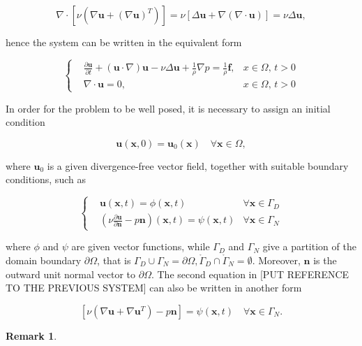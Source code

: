\documentclass[11pt,a4paper,titlepage]{report}
\newtheorem*{remark}{Remark}
\begin{document}
\[
\nabla \cdot [ \nu (\nabla \mathbf{u} + (\nabla  \mathbf{u})^T)] = \nu [\Delta \mathbf{u} + \nabla(\nabla \cdot \mathbf{u})] = \nu \Delta \mathbf{u},
\]

hence the system can be written in the equivalent form

\[
\left\{  
\begin{aligned}
&\frac{\partial \mathbf{u}}{\partial t} + ( \mathbf{u} \cdot \nabla) \mathbf{u} - \nu \Delta \mathbf{u} + \frac{1}{\rho} \nabla p = \frac{1}{\rho} \mathbf{f},  & x \in \Omega, \, t>0 \\
& \nabla \cdot \mathbf{u} = 0, & x \in \Omega, \, t>0
\end{aligned}
\right.
\]

In order for the problem to be well posed, it is necessary to assign an initial condition 

\[
\mathbf{u} (\mathbf{x}, 0) = \mathbf{u}_0(\mathbf{x}) \quad \forall \mathbf{x} \in \Omega,
\]

where $\mathbf{u}_0$ is a given divergence-free vector field, together with suitable boundary conditions, such as

\[
\left\{  
\begin{aligned}
& \mathbf{u}(\mathbf{x},t) = \phi (\mathbf{x}, t) & \forall \mathbf{x} \in \Gamma_D \\
& \left( \nu \frac{\partial \mathbf{u}}{\partial \mathbf{n}} - p\mathbf{n} \right) (\mathbf{x},t) = \psi(\mathbf{x},t) & \forall \mathbf{x} \in \Gamma_N
\end{aligned}
\right.
\]

where $\phi$ and $\psi$ are given vector functions, while $\Gamma_D$ and $\Gamma_N$ give a partition of the domain boundary $\partial \Omega$, that is $\Gamma_D 	\cup \Gamma_N = \partial \Omega, \mathring{\Gamma}_D \cap \mathring{\Gamma}_N = \emptyset$. Moreover, $\mathbf{n}$ is the outward unit normal vector to $\partial \Omega$. The second equation in [PUT REFERENCE TO THE PREVIOUS SYSTEM] can also be written in another form

\[
[ \nu (\nabla \mathbf{u} + \nabla \mathbf{u}^T)  - p\mathbf{n} ] = \psi(\mathbf{x}, t)  \quad \forall \mathbf{x} \in \Gamma_N.
\]

\begin{remark}
\end{remark}
\end{document}
